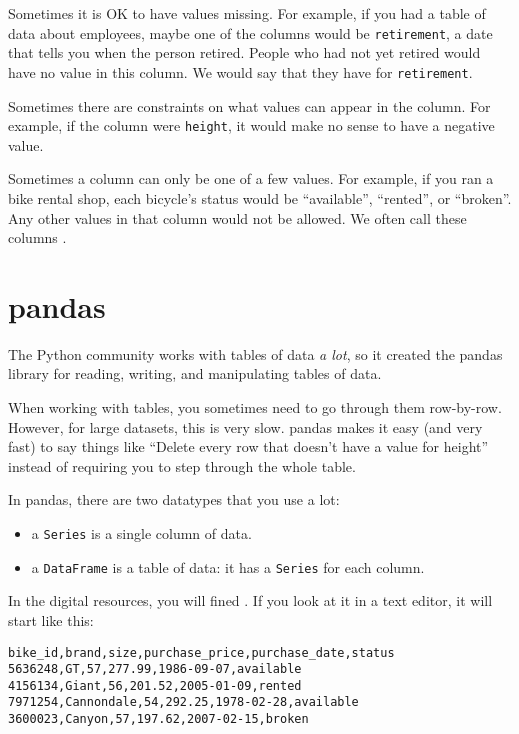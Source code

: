 Sometimes it is OK to have values missing.  For example, if you had a
table of data about employees, maybe one of the columns would be
\texttt{retirement}, a date that tells you when the person retired.  People who
had not yet retired would have no value in this column.  We would say
that they have  for \texttt{retirement}.

Sometimes there are constraints on what values can appear in the
column.  For example, if the column were \texttt{height}, it would make no
sense to have a negative value.

Sometimes a column can only be one of a few values. For example, if
you ran a bike rental shop, each bicycle's status would be ``available'',
``rented'', or ``broken''.  Any other values in that column would not
be allowed.  We often call these columns .

\section{pandas}

The Python community works with tables of data \emph{a lot}, so it
created the pandas library for reading, writing, and manipulating
tables of data.

When working with tables, you sometimes need to go through them
row-by-row. However, for large datasets, this is very slow. pandas
makes it easy (and very fast) to say things like ``Delete every row
that doesn't have a value for height'' instead of requiring you to
step through the whole table.

In pandas, there are two datatypes that you use a lot:
\begin{itemize}
\item a \texttt{Series} is a single column of data.
\item a \texttt{DataFrame} is a table of data: it has a \texttt{Series} for each column.
\end{itemize}

In the digital resources, you will fined . If you
look at it in a text editor, it will start like this:
\begin{Verbatim}
bike_id,brand,size,purchase_price,purchase_date,status
5636248,GT,57,277.99,1986-09-07,available
4156134,Giant,56,201.52,2005-01-09,rented
7971254,Cannondale,54,292.25,1978-02-28,available
3600023,Canyon,57,197.62,2007-02-15,broken
\end{Verbatim}

